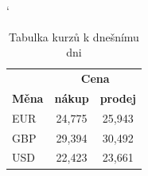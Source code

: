 \documentclass[11pt,a4paper]{article}
\begin{document}
\catcode`
\begin{table}[h]
    \begin{center}
        \begin{tabular}{|l|c|c|}\hline
                 &\multicolumn{2}{c|}{\textbf{Cena}}\\ \cline{2-3} 
            \textbf{Měna} & \textbf{nákup} & \textbf{prodej}\\ \hline
            EUR  & 24,775 & 25,943\\
            GBP  & 29,394 & 30,492\\
            USD  & 22,423 & 23,661\\ \hline
        \end{tabular}
        \caption{Tabulka kurzů k dnešnímu dni}
        \label{tab1}
    \end{center}
\end{table}

\bigskip
\end{document}
